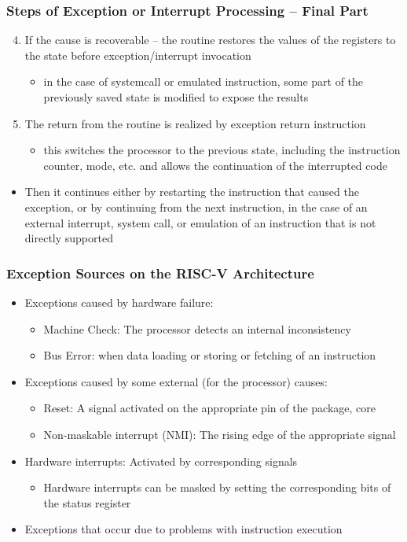 \documentclass{beamer}
\begin{document}
\begin{frame}
\frametitle{Steps of Exception or Interrupt Processing -- Final Part}

\begin{enumerate}
 \setcounter{enumi}{3}
 \item If the cause is recoverable -- the routine restores the values ​​of the registers to the state before exception/interrupt invocation
 \begin{itemize}
  \item in the case of systemcall or emulated instruction, some part of the previously saved state is modified to expose the results
 \end{itemize}
 \item The return from the routine is realized by exception return instruction
 \begin{itemize}
  \item this switches the processor to the previous state, including the instruction counter, mode, etc. and allows the continuation of the interrupted code
 \end{itemize}
\end{enumerate}
\begin{itemize}
 \item Then it continues either by restarting the instruction that caused the exception, or by continuing from the next instruction, in the case of an external interrupt, system call, or emulation of an instruction that is not directly supported
\end{itemize}
\end{frame}

\begin{frame}
\frametitle{Exception Sources on the RISC-V Architecture}

\begin{itemize}
 \item Exceptions caused by hardware failure:
 \begin{itemize}
  \item Machine Check: The processor detects an internal inconsistency
  \item Bus Error: when data loading or storing or fetching of an instruction
 \end{itemize}
 \item Exceptions caused by some external (for the processor) causes:
 \begin{itemize}
  \item Reset: A signal activated on the appropriate pin of the package, core
  \item Non-maskable interrupt (NMI): The rising edge of the appropriate signal
 \end{itemize}
 \item Hardware interrupts: Activated by corresponding signals
 \begin{itemize}
  \item Hardware interrupts can be masked by setting the corresponding bits of the status register
 \end{itemize}
 \item Exceptions that occur due to problems with instruction execution
\end{itemize}
\end{frame}
\end{document}
